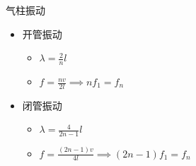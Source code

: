 \begin{itembox}[l]{气柱振动}
    \begin{itemize}
        \item 开管振动
        \begin{itemize}
            \item $\lambda=\frac{2}{n}l$
            \item $f=\frac{nv}{2l}\implies nf_1=f_n$
        \end{itemize}
        \item 闭管振动
        \begin{itemize}
            \item $\lambda=\frac{4}{2n-1}l$
            \item $f=\frac{(2n-1)v}{4l}\implies (2n-1)f_1=f_n$
        \end{itemize}
    \end{itemize}
\end{itembox}
